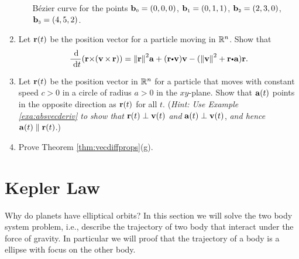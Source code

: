 \begin{multicols}{2}
\begin{problem}
\begin{enumerate}
\begin{enumerate}[(a)]
Bézier curve for the points
   $\mathbf{ b}_{\scriptscriptstyle 0} = (0,0,0)$, $\mathbf{ b}_{\scriptscriptstyle 1} = (0,1,1)$, 
$\mathbf{ b}_{\scriptscriptstyle 2} = (2,3,0)$,
   $\mathbf{ b}_{\scriptscriptstyle 3} = (4,5,2)$.
  \end{enumerate}
 \item Let $\mathbf{ r}(t)$ be the position vector for a particle moving in 
$\mathbb{R}^n$. Show that
  \begin{displaymath}
   \dfrac{\d}{\dt} ( \Crossprod{\vector{r}}{( 
\Crossprod{\vector{v}\,}{\,\vector{r}} )} ) =
    \norm{\vector{r}}^2 \vector{a} + (\Dotprod{\vector{r}}{\vector{v}}) 
\vector{v} -
    (\norm{\vector{v}}^2 + \Dotprod{\vector{r}}{\vector{a}})\vector{r} .
  \end{displaymath}
 \item Let $\mathbf{ r}(t)$ be the position vector in $\mathbb{R}^n$ for a particle 
that moves with constant speed $c > 0$
  in a circle of radius $a > 0$ in the $xy$-plane. Show that $\mathbf{ a}(t)$ 
points in the opposite direction as
  $\mathbf{ r}(t)$ for all $t$. (\emph{Hint: Use Example \ref{exa:absvecderiv} to 
show that} $\mathbf{ r}(t)
  \perp \mathbf{ v}(t)$ \emph{and} $\mathbf{ a}(t) \perp \mathbf{ v}(t)$, \emph{and 
hence} $\mathbf{ a}(t) \parallel
  \mathbf{ r}(t)$.)
 \item Prove Theorem \ref{thm:vecdiffprops}(g).
\end{enumerate}
\end{problem}
\end{multicols}

\section{Kepler Law}

Why do planets have elliptical orbits?
In this section we will solve the two
body system problem, i.e., describe the trajectory of two body that interact 
under the force of gravity. In particular  we will proof that the trajectory of 
a body is a ellipse with focus on the other body.


